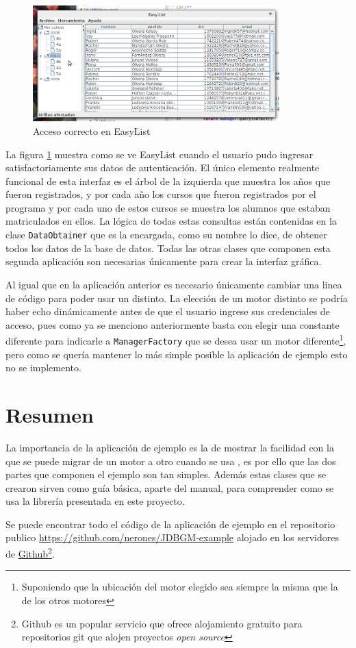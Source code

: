 \begin{figure}[h]
  \centering
    \includegraphics[width=0.85\textwidth]{figuras/ejemplo-c.png}
  \caption{Acceso correcto en EasyList}
  \label{fig:easylist}
\end{figure}

La figura \ref{fig:easylist} muestra como se ve EasyList cuando el usuario pudo ingresar satisfactoriamente sus datos de autenticación. El único elemento realmente funcional de esta interfaz es el árbol de la izquierda que muestra los años que fueron registrados, y por cada año los cursos que fueron registrados por el programa y por cada uno de estos cursos se muestra los alumnos que estaban matriculados en ellos. La lógica de todas estas consultas están contenidas en la clase \verb=DataObtainer= que es la encargada, como su nombre lo dice, de obtener todos los datos de la base de datos. Todas las otras clases que componen esta segunda aplicación son necesarias únicamente para crear la interfaz gráfica.

Al igual que en la aplicación anterior es necesario únicamente cambiar una linea de código para poder usar un \dd distinto. La elección de un motor distinto se podría haber echo dinámicamente  antes de que el usuario ingrese sus credenciales de acceso, pues como ya se menciono anteriormente basta con elegir una constante diferente para indicarle a \verb=ManagerFactory= que se desea usar un motor diferente\footnote{Suponiendo que la ubicación del motor elegido sea siempre la misma que la de los otros motores}, pero como se quería mantener lo más simple posible la aplicación de ejemplo esto no se implemento.

\section{Resumen}
La importancia de la aplicación de ejemplo es la de mostrar la facilidad con la que se puede migrar de un motor a otro cuando se usa \jj, es por ello que las dos partes que componen el ejemplo son tan simples. Además estas clases que se crearon sirven como guía básica, aparte del manual, para comprender como se usa la librería presentada en este proyecto.

Se puede encontrar todo el código de la aplicación de ejemplo en el repositorio publico \url{https://github.com/nerones/JDBGM-example} alojado en los servidores de \href{https://github.com/}{Github}\footnote{Github es un popular servicio que ofrece alojamiento gratuito para repositorios git que alojen proyectos \textit{open source}}.
